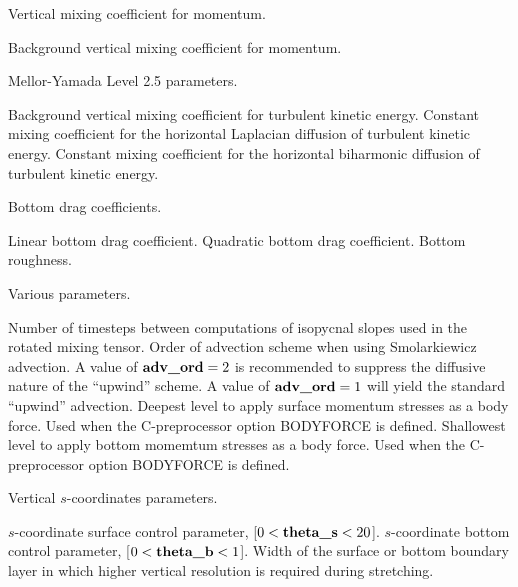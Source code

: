 \begin{klist}
\begin{klist}
     \end{klist}
      Vertical mixing coefficient for momentum.
     \begin{klist}
         Background vertical mixing coefficient 
     for momentum.
     \end{klist}
      Mellor-Yamada Level 2.5 parameters.
     \begin{klist}
         Background vertical mixing coefficient
     for turbulent kinetic energy.
           Constant mixing coefficient for the horizontal
     Laplacian diffusion of turbulent kinetic energy.
           Constant mixing coefficient for the horizontal
     biharmonic diffusion of turbulent kinetic energy.
     \end{klist}
      Bottom drag coefficients.
     \begin{klist}
            Linear bottom drag coefficient.
           Quadratic bottom drag coefficient.
              Bottom roughness.
     \end{klist}
     Various parameters.
     \begin{klist}
         Number of timesteps between computations of
     isopycnal slopes used in the rotated mixing tensor.
         Order of advection scheme when using
     Smolarkiewicz advection.  A value of $\mbox{\bf adv\_ord}=2$ is
     recommended to suppress the diffusive nature of the ``upwind''
     scheme.  A value of $\mbox{\bf adv\_ord}=1$
     will yield the standard ``upwind'' advection.
         Deepest level to apply surface momentum
     stresses as a body force.
            Used when the C-preprocessor option BODYFORCE is defined.
         Shallowest level to apply bottom momemtum
    stresses as a body force.
            Used when the C-preprocessor option BODYFORCE is defined.
     \end{klist}
     Vertical $s$-coordinates parameters.
     \begin{klist}
         $s$-coordinate surface control parameter,
     [$0 < \mbox{\bf theta\_s} < 20$].
         $s$-coordinate bottom  control parameter,
     [$0 < \mbox{\bf theta\_b} < 1$].
          Width of the surface or bottom boundary layer
     in which higher vertical resolution is required during stretching.


\end{klist}
\end{klist}
